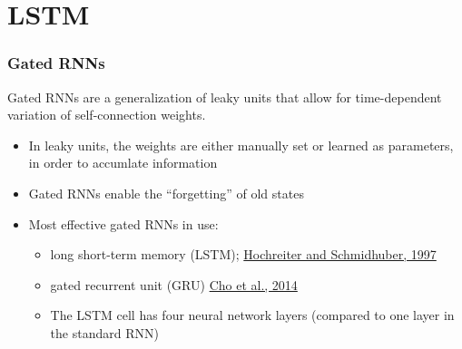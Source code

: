 \documentclass[smaller]{beamer}
\begin{document}
  \section{LSTM}
\begin{frame} 
  \frametitle{Gated RNNs}
  \pause

  Gated RNNs are a generalization of leaky units that allow for time-dependent variation of self-connection
  weights. \pause
  \begin{itemize}
    \item In leaky units, the weights are either manually set or learned as parameters, in order to accumlate information
  \item Gated RNNs enable the ``forgetting'' of old states
  \item Most effective gated RNNs in use:\pause
    \begin{itemize}
    \item long short-term memory (LSTM); \href{http://www.bioinf.jku.at/publications/older/2604.pdf}{Hochreiter and
        Schmidhuber, 1997}\pause
    \item gated recurrent unit (GRU) \href{https://arxiv.org/pdf/1406.1078v3.pdf}{Cho et al., 2014}\pe
    \item   The LSTM cell has four neural network layers (compared to one layer in the standard RNN)        
    \end{itemize}
  \end{itemize}
 
  \pause

\end{frame}
 
\end{document}
